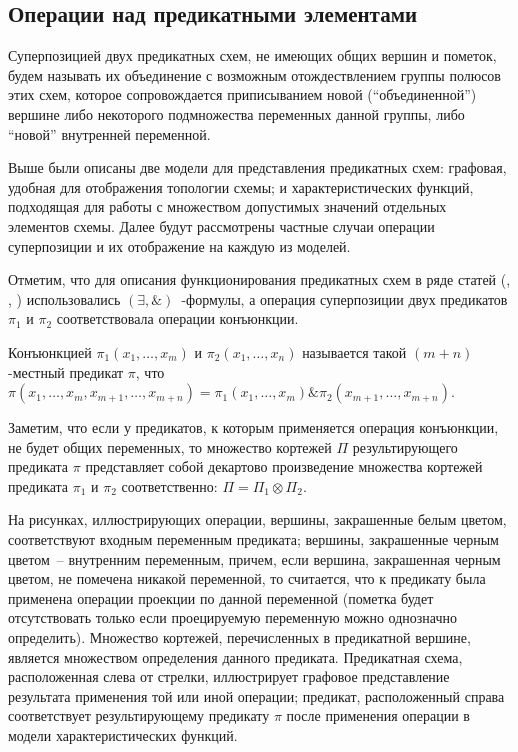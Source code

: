 \documentclass[12pt]{article}
\newenvironment{definition}[1][Определение]{\begin{trivlist}
\item[\hskip \labelsep {\bfseries #1}]}{\end{trivlist}}
\begin{document}
\subsection{Операции над предикатными элементами}

\begin{definition}
Суперпозицией двух предикатных схем, не имеющих общих вершин и пометок, 
будем называть их объединение с возможным отождествлением группы полюсов этих схем, 
которое сопровождается приписыванием новой (``объединенной'') вершине либо 
некоторого подмножества переменных данной группы, либо ``новой'' внутренней переменной.
\end{definition}

Выше были описаны две модели для представления предикатных схем: графовая, удобная для отображения топологии схемы; 
и характеристических функций, подходящая для работы с множеством допустимых значений отдельных элементов схемы. Далее 
будут рассмотрены частные случаи операции суперпозиции и их отображение на каждую из моделей.

Отметим, что для описания функционирования предикатных схем в ряде статей (\cite{Marchenkov}, \cite{Zhuk}, \cite{Shu09})
использовались $(\exists, \&)$~-формулы, а операция суперпозиции двух предикатов $\pi_1$ и $\pi_2$ соответствовала
операции конъюнкции.

\begin{definition}
Конъюнкцией $\pi_1(x_1, \dots, x_m)$ и $\pi_2(x_1, \dots, x_n)$ называется такой $(m+n)$-местный предикат $\pi$, что
$\pi(x_1, \dots, x_m, x_{m+1}, \dots, x_{m+n}) = \pi_1(x_1, \dots, x_m) \& \pi_2(x_{m+1}, \dots, x_{m+n})$.
\end{definition}

Заметим, что если у предикатов, к которым применяется операция конъюнкции,
не будет общих переменных, то множество кортежей $\Pi$ результирующего предиката 
$\pi$ представляет собой декартово произведение множества кортежей предиката $\pi_1$ и $\pi_2$ соответственно:
$\Pi = \Pi_1 \otimes \Pi_2$.

На рисунках, иллюстрирующих операции, вершины, закрашенные белым цветом, соответствуют входным переменным предиката; 
вершины, закрашенные черным цветом~-- внутренним переменным, причем, если вершина, закрашенная черным цветом, 
не помечена никакой переменной, то считается, что к предикату была применена операции 
проекции по данной переменной (пометка будет отсутствовать только если проецируемую переменную можно однозначно определить).
Множество кортежей, перечисленных в предикатной вершине, является множеством определения данного предиката. 
Предикатная схема, расположенная слева от стрелки, иллюстрирует графовое представление результата применения той или иной
операции; предикат, расположенный справа соответствует результирующему предикату $\pi$ после применения операции 
в модели характеристических функций.
\end{document}

